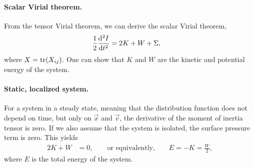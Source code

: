 \paragraph*{Scalar Virial theorem.}
From the tensor Virial theorem, we can derive the scalar Virial theorem,
\begin{align*}
	\frac{1}{2} \dv[2]{I}{t}
	&= 2 K + W + \Sigma,
\end{align*}
where $X = \tr(X_{ij})$. One can show that $K$ and $W$ are the kinetic and potential energy of the system.

\paragraph*{Static, localized system.}
For a system in a steady state, meaning that the distribution function does not depend on time, but only on $\vec{x}$ and $\vec{v}$, the derivative of the moment of inertia tensor is zero. If we also assume that the system is isolated, the surface pressure term is zero. This yields
\begin{align*}
	2 K + W &= 0,
	\qquad \text{or equivalently,} \qquad
	E = - K = \frac{W}{2},
\end{align*}
where $E$ is the total energy of the system.




